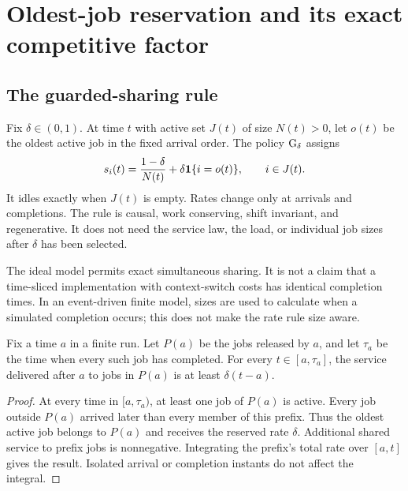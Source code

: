 \section{Oldest-job reservation and its exact competitive factor}\label{sec:reservation}
\subsection{The guarded-sharing rule}
Fix $\delta\in(0,1)$. At time $t$ with active set $J(t)$ of size $N(t)>0$, let $o(t)$ be the oldest active job in the fixed arrival order. The policy $\operatorname{G}_\delta$ assigns
\begin{equation}\label{eq:guard-rule}
 s_i(t)=\frac{1-\delta}{N(t)}+\delta\mathbf 1\{i=o(t)\},
 \qquad i\in J(t).
\end{equation}
It idles exactly when $J(t)$ is empty. Rates change only at arrivals and completions. The rule is causal, work conserving, shift invariant, and regenerative. It does not need the service law, the load, or individual job sizes after $\delta$ has been selected.

The ideal model permits exact simultaneous sharing. It is not a claim that a time-sliced implementation with context-switch costs has identical completion times. In an event-driven finite model, sizes are used to calculate when a simulated completion occurs; this does not make the rate rule size aware.

\begin{lemma}\label{lem:reservation}
Fix a time $a$ in a finite run. Let $P(a)$ be the jobs released by $a$, and let $\tau_a$ be the time when every such job has completed. For every $t\in[a,\tau_a]$, the service delivered after $a$ to jobs in $P(a)$ is at least $\delta(t-a)$.
\end{lemma}
\begin{proof}
At every time in $[a,\tau_a)$, at least one job of $P(a)$ is active. Every job outside $P(a)$ arrived later than every member of this prefix. Thus the oldest active job belongs to $P(a)$ and receives the reserved rate $\delta$. Additional shared service to prefix jobs is nonnegative. Integrating the prefix's total rate over $[a,t]$ gives the result. Isolated arrival or completion instants do not affect the integral.
\end{proof}

